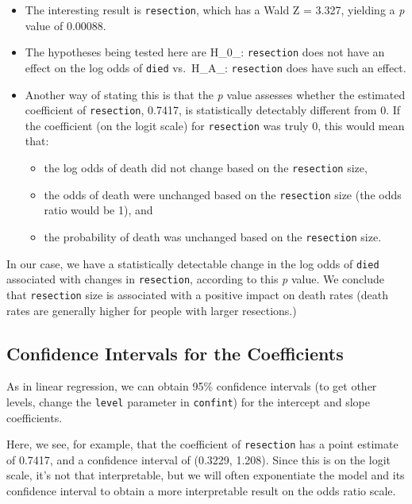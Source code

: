 \documentclass[]{book}
\providecommand{\tightlist}{%
  \setlength{\itemsep}{0pt}\setlength{\parskip}{0pt}}
\theoremstyle{definition}
\theoremstyle{definition}
\theoremstyle{definition}
\theoremstyle{remark}
\begin{document}
\begin{itemize}
\tightlist
\item
  The interesting result is \texttt{resection}, which has a Wald Z =
  3.327, yielding a \emph{p} value of 0.00088.
\item
  The hypotheses being tested here are H\_0\_: \texttt{resection} does
  not have an effect on the log odds of \texttt{died} vs.~H\_A\_:
  \texttt{resection} does have such an effect.
\item
  Another way of stating this is that the \emph{p} value assesses
  whether the estimated coefficient of \texttt{resection}, 0.7417, is
  statistically detectably different from 0. If the coefficient (on the
  logit scale) for \texttt{resection} was truly 0, this would mean that:

  \begin{itemize}
  \tightlist
  \item
    the log odds of death did not change based on the \texttt{resection}
    size,
  \item
    the odds of death were unchanged based on the \texttt{resection}
    size (the odds ratio would be 1), and
  \item
    the probability of death was unchanged based on the
    \texttt{resection} size.
  \end{itemize}
\end{itemize}

In our case, we have a statistically detectable change in the log odds
of \texttt{died} associated with changes in \texttt{resection},
according to this \emph{p} value. We conclude that \texttt{resection}
size is associated with a positive impact on death rates (death rates
are generally higher for people with larger resections.)

\subsection{Confidence Intervals for the
Coefficients}\label{confidence-intervals-for-the-coefficients}

As in linear regression, we can obtain 95\% confidence intervals (to get
other levels, change the \texttt{level} parameter in \texttt{confint})
for the intercept and slope coefficients.

Here, we see, for example, that the coefficient of \texttt{resection}
has a point estimate of 0.7417, and a confidence interval of (0.3229,
1.208). Since this is on the logit scale, it's not that interpretable,
but we will often exponentiate the model and its confidence interval to
obtain a more interpretable result on the odds ratio scale.
\end{document}
